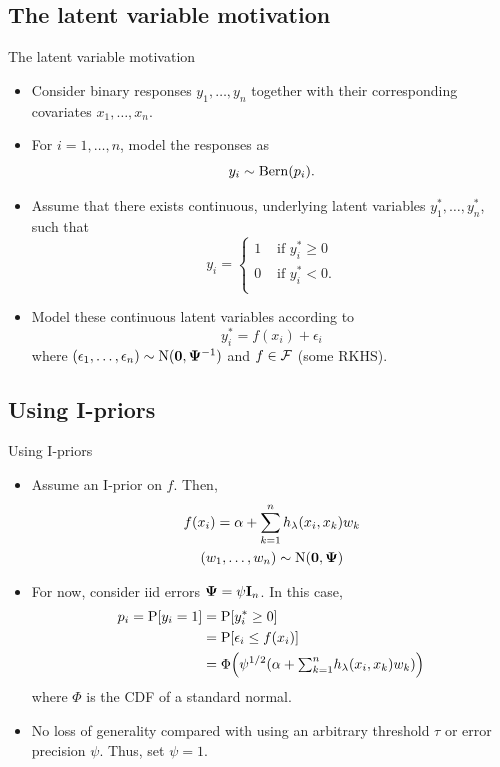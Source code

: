 \subsection{The latent variable motivation}

\begin{frame}{The latent variable motivation}
  \begin{itemize}
    \item Consider binary responses $y_1, \dots, y_n$ together with their corresponding covariates $x_1, \dots, x_n$. 
    \item For $i=1,\dots,n$, model the responses as
    \[
      y_i \sim \operatorname{Bern}(p_i).
    \]
    \item Assume that there exists continuous, underlying latent variables $y_1^*, \dots, y_n^*$, such that
    \[
      y_i =
      \begin{cases}
        1 & \text{ if } y_i^* \geq 0 \\
        0 & \text{ if } y_i^* < 0.    \\
      \end{cases}
    \]
    \item Model these continuous latent variables according to
    \[
      y_i^* = f(x_i) + \epsilon_i
    \]
    where $(\epsilon_1, \dots, \epsilon_n) \sim \operatorname{N}({\mathbf 0}, {\bm\Psi}^{-1})$ and $f \in {\mathcal F}$ (some RKHS).
  \end{itemize}
\end{frame}

\subsection{Using I-priors}
\begin{frame}{Using I-priors}
  \begin{itemize}
    \item Assume an I-prior on $f$. Then,
    \begin{align*}
      \begin{gathered}
        f(x_i) = \alpha + \sum_{k=1}^n h_\lambda(x_i, x_k)w_k \\
        (w_1, \dots, w_n) \sim \operatorname{N}({\mathbf 0}, {\bm\Psi}) \\
      \end{gathered}
    \end{align*}
    \item For now, consider iid errors ${\bm\Psi} = \psi{\mathbf I}_n$. In this case,
    \begin{align*}
      p_i = \operatorname{P}[y_i = 1] &= \operatorname{P}[y_i^* \geq 0] \\
      &= \operatorname{P}[\epsilon_i \leq f(x_i)] \\
      &= \Phi\Big(\psi^{1/2} ( 
      \alpha + {\textstyle\sum_{k=1}^n} h_\lambda(x_i, x_k)w_k
      ) \Big)
    \end{align*}
    where $\Phi$ is the CDF of a standard normal.
    \item No loss of generality compared with using an arbitrary threshold $\tau$ or error precision $\psi$. Thus, set $\psi = 1$.
  \end{itemize}
\end{frame}

